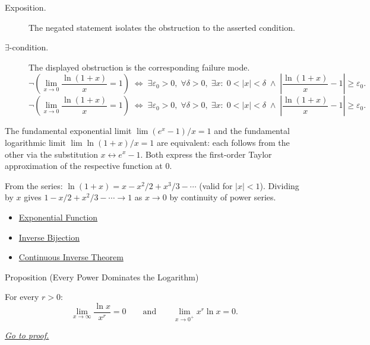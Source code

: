 \begin{remark*}
\begin{description}
  \item[Exposition.]
  The negated statement isolates the obstruction to the asserted condition.

  \item[\(\exists\)-condition.]
  The displayed obstruction is the corresponding failure mode.
  \[
\neg\left(\lim_{x\to 0}\frac{\ln(1+x)}{x}=1\right)
  \;\iff\;
  \exists\varepsilon_0>0,\;\forall\delta>0,\;\exists x:\;
  0<|x|<\delta \;\wedge\;
  \left|\frac{\ln(1+x)}{x}-1\right|\geq\varepsilon_0.
  \]
  \[
\neg\left(\lim_{x\to 0}\frac{\ln(1+x)}{x}=1\right)
  \;\iff\;
  \exists\varepsilon_0>0,\;\forall\delta>0,\;\exists x:\;
  0<|x|<\delta \;\wedge\;
  \left|\frac{\ln(1+x)}{x}-1\right|\geq\varepsilon_0.
  \]
\end{description}
\end{remark*}



\begin{remark*}[Interpretation]
The fundamental exponential limit $\lim(e^x-1)/x = 1$ and the
fundamental logarithmic limit $\lim\ln(1+x)/x = 1$ are equivalent:
each follows from the other via the substitution $x \leftrightarrow
e^x - 1$. Both express the first-order Taylor approximation of the
respective function at $0$.


From the series: $\ln(1+x) = x - x^2/2 + x^3/3 - \cdots$ (valid
for $|x| < 1$). Dividing by $x$ gives $1 - x/2 + x^2/3 - \cdots
\to 1$ as $x \to 0$ by continuity of power series.
\end{remark*}

\begin{dependencies}
\begin{itemize}
  \item \hyperref[def:exponential]{Exponential Function}
  \item \hyperref[prop:inverse-bijection]{Inverse Bijection}
  \item \hyperref[thm:continuous-inverse-theorem]{Continuous Inverse Theorem}
\end{itemize}
\end{dependencies}


\begin{propositionbox}{Proposition (Every Power Dominates the Logarithm)}
\begin{proposition}
\label{prop:power-dominates-log}
For every $r > 0$:
\[
  \lim_{x \to \infty} \frac{\ln x}{x^r} = 0
  \qquad\text{and}\qquad
  \lim_{x \to 0^+} x^r \ln x = 0.
\]

\smallskip\noindent


\hyperref[prf:power-dominates-log]{\textit{Go to proof.}}
\end{proposition}
\end{propositionbox}

